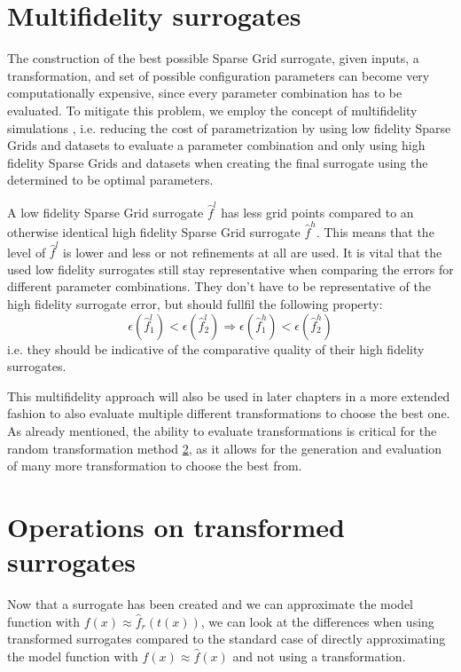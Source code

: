 \documentclass[
  a4paper,  %
  twoside,  %
  bibliography=totoc,
  headsepline,
  cleardoublepage=empty,
  parskip=half,
  draft=false
]{scrbook}
\begin{document}
\section{Multifidelity surrogates}

The construction of the best possible Sparse Grid surrogate, given inputs, a transformation, and set of possible configuration parameters can become very computationally expensive, since every parameter combination has to be evaluated.
To mitigate this problem, we employ the concept of multifidelity simulations \cite{}, i.e. reducing the cost of parametrization by using low fidelity Sparse Grids and datasets to evaluate a parameter combination and only using high fidelity Sparse Grids and datasets when creating the final surrogate using the determined to be optimal parameters.

A low fidelity Sparse Grid surrogate $\hat{f}^l$ has less grid points compared to an otherwise identical high fidelity Sparse Grid surrogate $\hat{f}^h$.
This means that the level of $\hat{f}^l$ is lower and less or not refinements at all are used.
It is vital that the used low fidelity surrogates still stay representative when comparing the errors for different parameter combinations.
They don't have to be representative of the high fidelity surrogate error, but should fullfil the following property:
\begin{equation}
\epsilon(\hat{f}_1^l) < \epsilon(\hat{f}_2^l) \Rightarrow \epsilon(\hat{f}_1^h) < \epsilon(\hat{f}_2^h)
\end{equation}
i.e. they should be indicative of the comparative quality of their high fidelity surrogates.

This multifidelity approach will also be used in later chapters in a more extended fashion to also evaluate multiple different transformations to choose the best one.
As already mentioned, the ability to evaluate transformations is critical for the random transformation method \ref{}, as it allows for the generation and evaluation of many more transformation to choose the best from.

\section{Operations on transformed surrogates}

Now that a surrogate has been created and we can approximate the model function with $f(x) \approx \hat{f}_r(t(x))$,
we can look at the differences when using transformed surrogates compared to the standard case of directly approximating the model function with $f(x) \approx \hat{f}(x)$ and not using a transformation.
\end{document}
